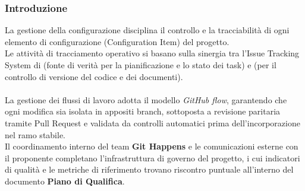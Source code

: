 \subsubsection{Introduzione}
La gestione della configurazione disciplina il controllo e la tracciabilità di ogni elemento di configurazione (Configuration Item) del progetto. \\
Le attività di tracciamento operativo si basano sulla sinergia tra l'Issue Tracking System di  (fonte di verità per la pianificazione e lo stato dei task) e  (per il controllo di versione del codice e dei documenti). \\
\\
La gestione dei flussi di lavoro adotta il modello \emph{GitHub flow}, garantendo che ogni modifica sia isolata in appositi branch, sottoposta a revisione paritaria tramite Pull Request e validata da controlli automatici prima dell'incorporazione nel ramo stabile. \\
Il coordinamento interno del team \textbf{Git Happens} e le comunicazioni esterne con il proponente completano l'infrastruttura di governo del progetto, i cui indicatori di qualità e le metriche di riferimento trovano riscontro puntuale all'interno del documento \textbf{Piano di Qualifica}.